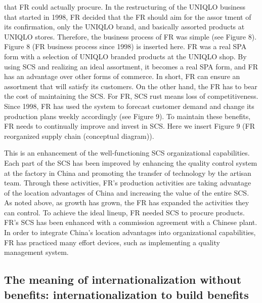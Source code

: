 \documentclass[]{article}
\begin{document}
that FR could actually procure. In the restructuring of the UNIQLO
business that started in 1998, FR decided that the FR should aim for the
assor tment of its confirmation, only the UNIQLO brand, and basically
assorted products at UNIQLO stores. Therefore, the business process of
FR was simple (see Figure 8). Figure 8 (FR business process since 1998)
is inserted here. FR was a real SPA form with a selection of UNIQLO
branded products at the UNIQLO shop. By using SCS and realizing an ideal
assortment, it becomes a real SPA form, and FR has an advantage over
other forms of commerce. In short, FR can ensure an assortment that will
satisfy its customers. On the other hand, the FR has to bear the cost of
maintaining the SCS. For FR, SCS rust means loss of competitiveness.
Since 1998, FR has used the system to forecast customer demand and
change its production plans weekly accordingly (see Figure 9). To
maintain these benefits, FR needs to continually improve and invest in
SCS. Here we insert Figure 9 (FR reorganized supply chain (conceptual
diagram)).

This is an enhancement of the well-functioning SCS organizational
capabilities. Each part of the SCS has been improved by enhancing the
quality control system at the factory in China and promoting the
transfer of technology by the artisan team. Through these activities,
FR's production activities are taking advantage of the location
advantages of China and increasing the value of the entire SCS. As noted
above, as growth has grown, the FR has expanded the activities they can
control. To achieve the ideal lineup, FR needed SCS to procure products.
FR's SCS has been enhanced with a commission agreement with a Chinese
plant. In order to integrate China's location advantages into
organizational capabilities, FR has practiced many effort devices, such
as implementing a quality management system.

\hypertarget{the-meaning-of-internationalization-without-benefits-internationalization-to-build-benefits}{%
\subsection{The meaning of internationalization without benefits:
internationalization to build
benefits}\label{the-meaning-of-internationalization-without-benefits-internationalization-to-build-benefits}}
\end{document}
